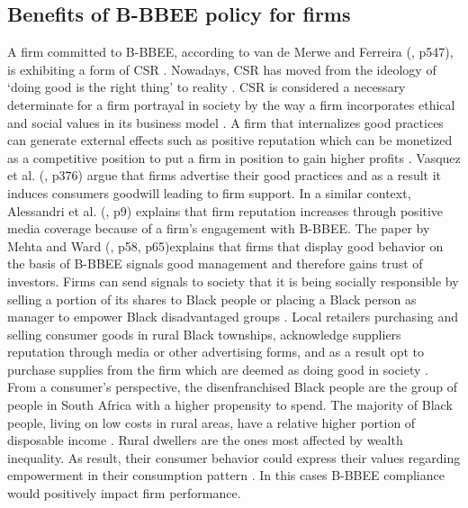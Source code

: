 \subsection{Benefits of B-BBEE policy for firms}
A firm committed to B-BBEE, according to van de Merwe and Ferreira (\citeyear{N7}, p547), is exhibiting a form of CSR . Nowadays, CSR has moved from the ideology of ‘doing good is the right thing’ to reality \cite[p1]{N54}. CSR is considered a necessary determinate for a firm portrayal in society by the way a firm incorporates ethical and social values in its business model \cite[p1]{N54}. A firm that internalizes good practices can generate external effects such as positive reputation which can be monetized as a competitive position to put a firm in position to gain higher profits \cite[p376]{N34}. Vasquez et al. (\citeyear{N34}, p376) argue that firms advertise their good practices and as a result it induces consumers goodwill leading to firm support. In a similar context, Alessandri et al. (\citeyear{N24}, p9) explains that firm reputation increases through positive media coverage because of a firm's engagement with B-BBEE. The paper by Mehta and Ward (\citeyear{N39}, p58, p65)explains that firms that display good behavior on the basis of B-BBEE signals good management and therefore gains trust of investors. Firms can send signals to society that it is being socially responsible by selling a portion of its shares to Black people or placing a Black person as manager to empower Black disadvantaged groups \cite[p9]{N24}. Local retailers purchasing and selling consumer goods in rural Black townships, acknowledge suppliers reputation through media or other advertising forms, and as a result opt to purchase supplies from the firm which are deemed as doing good in society \cite[p9]{N24}. From a consumer’s perspective, the disenfranchised Black people are the group of people in South Africa with a higher propensity to spend. The majority of Black people, living on low costs in rural areas, have a relative higher portion of disposable income \cite[p9]{N24}. Rural dwellers are the ones most affected by wealth inequality. As result, their consumer behavior could express their values regarding empowerment in their consumption pattern \cite[p378]{N34}. In this cases B-BBEE compliance would positively impact firm performance.

